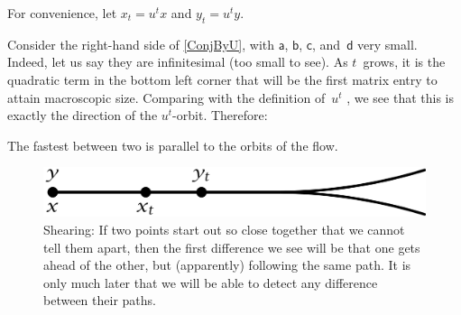 \begin{notation}
 For convenience, let $x_t = u^t x$ and $y_t = u^t y$.
 \end{notation}

Consider the right-hand side of \cref{ConjByU}, with $\mathsf{a}$, $\mathsf{b}$,
$\mathsf{c}$, and~$\mathsf{d}$ very small. Indeed, let us say they are
infinitesimal (too small to see). As $t$~grows, it is
the quadratic term in the bottom left corner that will be the first matrix entry to attain
macroscopic size. Comparing with the definition
of~$u^t$ , we see that this is exactly the direction
of the $u^t$-orbit. Therefore:


\begin{prop}
\label{ShearingSL2R}
 The fastest  between two
 is parallel to the orbits of the flow.
 \end{prop}

 \begin{figure}[ht]
 \begin{center}
 \includegraphics{PDF/shearing.jpg}
 \caption{Shearing: If two points start out so close together that we
cannot tell them apart, then the first difference we see will be that one
gets ahead of the other, but (apparently) following the same path. It is
only much later that we will be able to detect any difference between their paths.}
 \label{shearing}
 \end{center}
 \end{figure}
%
%
%
%
%
%

